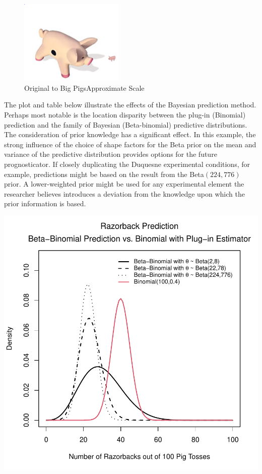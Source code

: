 \documentclass[12pt, a4paper]{article}
\begin{document}
\begin{figure}
  \begin{center}
    \includegraphics[width=0.44\textwidth]{./Graphics/PassThePigs/PigSize}
  \end{center}
  \caption{Original to Big Pigs\texttrademark Approximate Scale}
\end{figure}

  The plot and table below illustrate the effects of the Bayesian prediction method. Perhaps most notable is the location disparity between the plug-in (Binomial) prediction and the family of Bayesian (Beta-binomial) predictive distributions.  The consideration of prior knowledge has a significant effect.  In this example, the strong influence of the choice of shape factors for the Beta prior on the mean and variance of the predictive distribution provides options for the future prognosticator. If closely duplicating the Duquesne experimental conditions, for example, predictions might be based on the result from the Beta$(224,776)$ prior.  A lower-weighted prior might be used for any experimental element the researcher believes introduces a deviation from the knowledge upon which the prior information is based.


\vspace{1cm}

\includegraphics{Thesis_v3-002}
\end{document}
